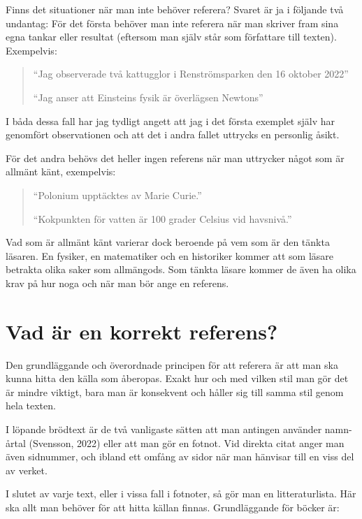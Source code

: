 \documentclass[11pt,a5paper,footinclude=true,headinclude=true]{scrbook} %
\begin{document}
\noindent Finns det situationer när man inte behöver referera? Svaret är ja i följande två undantag: För det första behöver man inte referera när man skriver fram sina egna tankar eller resultat (eftersom man själv står som författare till texten). Exempelvis:

\begin{quote}
``Jag observerade två kattugglor i Renströmsparken den 16 oktober 2022''

``Jag anser att Einsteins fysik är överlägsen Newtons''
\end{quote}

\noindent I båda dessa fall har jag tydligt angett att jag i det första exemplet själv har genomfört observationen och att det i andra fallet uttrycks en personlig åsikt. 

För det andra behövs det heller ingen referens när man uttrycker något som är allmänt känt, exempelvis:

\begin{quote}
``Polonium upptäcktes av Marie Curie.''

``Kokpunkten för vatten är 100 grader Celsius vid havsnivå.''
\end{quote}

\noindent Vad som är allmänt känt varierar dock beroende på vem som är den tänkta läsaren. En fysiker, en matematiker och en historiker kommer att som läsare betrakta olika saker som allmängods. Som tänkta läsare kommer de även ha olika krav på hur noga och när man bör ange en referens. 

\section{Vad är en korrekt referens?}

Den grundläggande och överordnade principen för att referera är att man ska kunna hitta den källa som åberopas. Exakt hur och med vilken stil man gör det är mindre viktigt, bara man är konsekvent och håller sig till samma stil genom hela texten. 

I löpande brödtext är de två vanligaste sätten att man antingen använder namn-årtal (Svensson, 2022) eller att man gör en fotnot. Vid direkta citat anger man även sidnummer, och ibland ett omfång av sidor när man hänvisar till en viss del av verket. 

I slutet av varje text, eller i vissa fall i fotnoter, så gör man en litteraturlista. Här ska allt man behöver för att hitta källan finnas. Grundläggande för böcker är:
\end{document}
